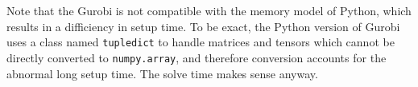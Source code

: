 \documentclass[english]{pkupaper}
\begin{document}
Note that the Gurobi is not compatible with the memory model of Python, which results in a difficiency in setup time. To be exact, the Python version of Gurobi uses a class named \verb"tupledict" to handle matrices and tensors which cannot be directly converted to \verb"numpy.array", and therefore conversion accounts for the abnormal long setup time. The solve time makes sense anyway.

	
\end{document}
